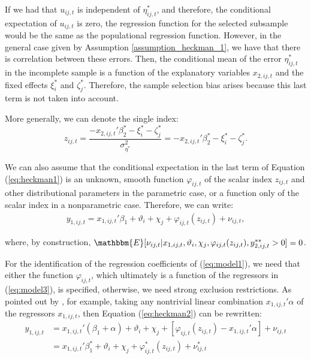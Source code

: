If we had that $u_{ij,t}$ is independent of $\eta^*_{i j,t}$, and therefore, the conditional expectation of $u_{ij,t}$ is zero, the regression function for the selected subsample would be the same as the populational regression function. However, in the general case given by Assumption \ref{assumption_heckman_1}, we have that there is correlation between these errors. Then, the conditional mean of the error $\eta^*_{i j,t}$ in the incomplete sample is a function of the explanatory variables  $x_{2,ij,t}$ and the fixed effects $\xi_{i}^*$ and $\zeta_{j}^*$. Therefore, the sample selection bias arises because this last term is not taken into account.

More generally, we can denote the single index:
$$z_{ij,t} = \frac{-{x_{2,ij,t}'{\beta_2^*}-\xi_{i}^*-\zeta_{j}^*}}{\sigma_{\eta^*}^2} = -x_{2,ij,t}'{\beta_2^*} -\xi_{i}^*-\zeta_{j}^*.$$ 

We can also assume that the conditional expectation in the last term of Equation (\ref{eq:heckman1}) is an unknown, smooth function $\varphi_{ij,t}$ of the scalar index $z_{ij,t}$ and other distributional parameters in the parametric case, or a function only of the scalar index in a nonparametric case. Therefore, we can write:
\begin{align}
    y_{1,ij,t} =  x_{1,ij,t}'\beta_1 + \vartheta_i + \chi_j + \varphi_{ij,t}(z_{ij,t}) + \nu_{ij,t},
    \label{eq:heckman2}
\end{align}

\noindent where, by construction, $\mathbbm{E}[\nu_{ij,t} \rvert x_{1,ij,t}, \vartheta_i, \chi_j, \varphi_{ij,t}(z_{ij,t}), y_{2,i j,t}^{**} > 0] = 0$.

For the identification of the regression coefficients of (\ref{eq:model1}), we need that either the function $\varphi_{ij,t}$, which ultimately is a function of the regressors in (\ref{eq:model3}), is specified, otherwise, we need strong exclusion restrictions. As pointed out by \cite{ahn1993semiparametric}, for example, taking any nontrivial linear combination $ x_{1,ij,t}'\alpha$ of the regressors $x_{1,ij,t}$, then Equation (\ref{eq:heckman2}) can be rewritten:
\begin{align}
    y_{1,ij,t} &=  x_{1,ij,t}'(\beta_1 + \alpha) + \vartheta_i + \chi_j + [ \varphi_{ij,t}(z_{ij,t}) - x_{1,ij,t}'\alpha] + \nu_{ij,t} \\
    &=  x_{1,ij,t}'{\beta_1^*}  + \vartheta_i + \chi_j +  \varphi_{ij,t}^*(z_{ij,t}) + \nu_{ij,t}^* \nonumber
    \label{eq:heckman3}
\end{align}

